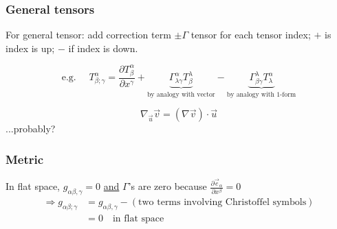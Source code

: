 \documentclass[a4paper]{article} %
\begin{document}
\subsubsection{General tensors}
For general tensor: add correction term $\pm \Gamma$ tensor for each tensor index; $+$ is index is up; $-$ if index is down.

\begin{equation}
\text{e.g. }\quad T^{\alpha}_{\beta;\gamma}=\frac{\partial T^{\alpha}_{\beta}}{\partial x^{\gamma}}
+\underbrace{\Gamma^{\alpha}_{\lambda\gamma} T^{\lambda}_{\beta}}_{\text{by analogy with vector}}
-\underbrace{\Gamma^{\lambda}_{\beta \gamma}T^{\alpha}_{\lambda}}_{\text{by analogy with 1-form}}
\end{equation}

\begin{equation}
\nabla_{\vec{u}}\vec{v}=(\nabla\vec{v})\cdot \vec{u}
\end{equation}
...probably?


\subsubsection{Metric}
In flat space, $g_{\alpha\beta , \gamma}=0$ \underline{and} $\Gamma$'s are zero because $\frac{\partial\vec{e}_{\alpha}}{\partial x^{\beta}}=0$
\begin{align}
\Rightarrow g_{\alpha\beta;\gamma}&=g_{\alpha\beta,\gamma}-(\text{two terms involving Christoffel symbols})\\
&=0 \quad\text{in flat space}
\end{align}

\end{document}
